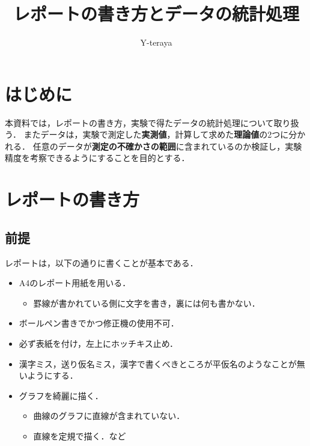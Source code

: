 \documentclass[a4paper,11pt]{ltjsarticle}
\title{レポートの書き方とデータの統計処理}
\author{Y-teraya}
\date{}
\begin{document}
\pagestyle{fancy}
\rhead{\textbf{\thepage}\ }
\cfoot{}
\renewcommand{\footrulewidth}{0.4pt}

\maketitle
{}

\section{はじめに}

本資料では，レポートの書き方，実験で得たデータの統計処理について取り扱う．
またデータは，実験で測定した\textbf{実測値}，計算して求めた\textbf{理論値}の2つに分かれる．
任意のデータが\textbf{測定の不確かさの範囲}に含まれているのか検証し，実験精度を考察できるようにすることを目的とする．

\section{レポートの書き方}

\subsection{前提}

レポートは，以下の通りに書くことが基本である．

\begin{itemize}
    \item A4のレポート用紙を用いる．
    \begin{itemize}
        \item 罫線が書かれている側に文字を書き，裏には何も書かない．
    \end{itemize}
    \item ボールペン書きでかつ修正機の使用不可．
    \item 必ず表紙を付け，左上にホッチキス止め．
    \item 漢字ミス，送り仮名ミス，漢字で書くべきところが平仮名のようなことが無いようにする．
    \item グラフを綺麗に描く．
    \begin{itemize}
        \item 曲線のグラフに直線が含まれていない．
        \item 直線を定規で描く．\hfill など
    \end{itemize}
\end{itemize}
\end{document}
